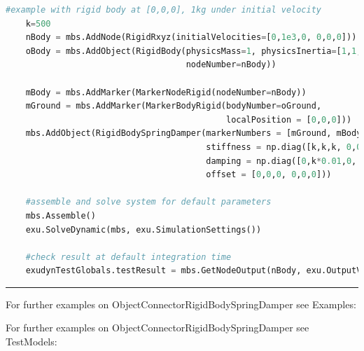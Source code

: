 \begin{lstlisting}[language=Python, firstnumber=1]
    #example with rigid body at [0,0,0], 1kg under initial velocity
    k=500
    nBody = mbs.AddNode(RigidRxyz(initialVelocities=[0,1e3,0, 0,0,0]))
    oBody = mbs.AddObject(RigidBody(physicsMass=1, physicsInertia=[1,1,1,0,0,0], 
                                    nodeNumber=nBody))
    
    mBody = mbs.AddMarker(MarkerNodeRigid(nodeNumber=nBody))
    mGround = mbs.AddMarker(MarkerBodyRigid(bodyNumber=oGround, 
                                            localPosition = [0,0,0]))
    mbs.AddObject(RigidBodySpringDamper(markerNumbers = [mGround, mBody], 
                                        stiffness = np.diag([k,k,k, 0,0,0]), 
                                        damping = np.diag([0,k*0.01,0, 0,0,0]), 
                                        offset = [0,0,0, 0,0,0]))
    
    #assemble and solve system for default parameters
    mbs.Assemble()
    exu.SolveDynamic(mbs, exu.SimulationSettings())
    
    #check result at default integration time
    exudynTestGlobals.testResult = mbs.GetNodeOutput(nBody, exu.OutputVariableType.Displacement)[1] 

\end{lstlisting}

\vspace{6pt}\par\noindent\rule{\textwidth}{0.4pt}
%
\noindent For further examples on ObjectConnectorRigidBodySpringDamper see Examples:
\bi
\item{}\ei

%
%
\noindent For further examples on ObjectConnectorRigidBodySpringDamper see TestModels:
\bi
\item{}\item{}\item{}\ei

